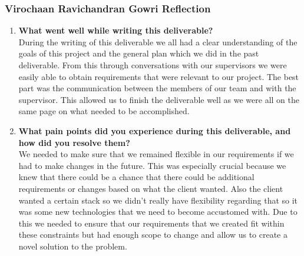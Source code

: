 \subsubsection*{Virochaan Ravichandran Gowri Reflection}
\begin{enumerate}
  \item \textbf{What went well while writing this deliverable?} \\
  During the writing of this deliverable we all had a clear understanding of the goals of this project and the general
  plan which we did in the past deliverable. From this through conversations with our supervisors we were easily able to
  obtain requirements that were relevant to our project. The best part was the communication between the members of our
  team and with the supervisor. This allowed us to finish the deliverable well as we were all on the same page on what needed to be accomplished.
  \item \textbf{What pain points did you experience during this deliverable, and how did you resolve them?} \\
  We needed to make sure that we remained flexible in our requirements if we had to make changes in the future. This was
  especially crucial because we knew that there could be a chance that there could be additional requirements or changes
  based on what the client wanted. Also the client wanted a certain stack so we didn't really have flexibility regarding
  that so it was some new technologies that we need to become accustomed with. Due to this we needed to ensure that our requirements that we created fit within these constraints but had enough scope to change and allow us to create a novel solution to the problem.

\end{enumerate}

